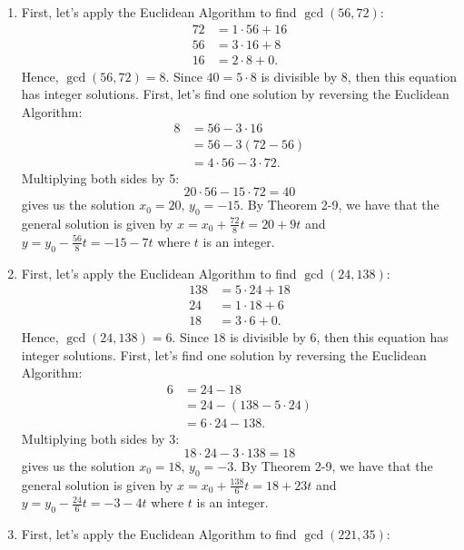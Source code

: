 \begin{solution}
    \begin{enumerate}
        \item First, let's apply the Euclidean Algorithm to find $\gcd(56, 72)$:
        \begin{align*}
            72 &= 1\cdot 56 + 16 \\
            56 &= 3 \cdot 16 + 8 \\
            16 &= 2\cdot 8 + 0.
        \end{align*}
        Hence, $\gcd(56, 72) = 8$. Since $40 = 5 \cdot 8$ is divisible by 8, then this equation has integer solutions. First, let's find one solution by reversing the Euclidean Algorithm:
        \begin{align*}
            8 &= 56 - 3\cdot 16 \\
            &= 56 - 3(72 - 56) \\
            &= 4\cdot 56 - 3\cdot 72.
        \end{align*}
        Multiplying both sides by 5:
        $$20 \cdot 56 - 15 \cdot 72 = 40$$
        gives us the solution $x_0 = 20$, $y_0 = -15$. By Theorem 2-9, we have that the general solution is given by $x = x_0 + \frac{72}{8}t = 20 + 9t$ and $y = y_0 - \frac{56}{8}t = -15 - 7t$ where $t$ is an integer.
        \item First, let's apply the Euclidean Algorithm to find $\gcd(24, 138)$:
        \begin{align*}
            138 &= 5\cdot 24 + 18 \\
            24 &= 1 \cdot 18 + 6 \\
            18 &= 3\cdot 6 + 0.
        \end{align*}
        Hence, $\gcd(24, 138) = 6$. Since $18$ is divisible by 6, then this equation has integer solutions. First, let's find one solution by reversing the Euclidean Algorithm:
        \begin{align*}
            6 &= 24 - 18 \\
            &= 24 - (138 - 5\cdot 24) \\
            &= 6\cdot 24 - 138.
        \end{align*}
        Multiplying both sides by 3:
        $$18 \cdot 24 - 3 \cdot 138 = 18$$
        gives us the solution $x_0 = 18$, $y_0 = -3$. By Theorem 2-9, we have that the general solution is given by $x = x_0 + \frac{138}{6}t = 18 + 23t$ and $y = y_0 - \frac{24}{6}t = -3 - 4t$ where $t$ is an integer.
        \item First, let's apply the Euclidean Algorithm to find $\gcd(221, 35)$:

\end{enumerate}
\end{solution}
